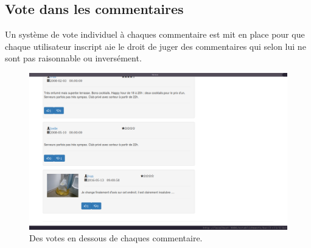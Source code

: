 \documentclass[a4paper,10pt]{article}
\begin{document}
\subsection{Vote dans les commentaires}
    Un système de vote individuel à chaques commentaire est mit en place pour
    que chaque utilisateur inscript aie le droit de juger des commentaires
    qui selon lui ne sont pas raisonnable ou inversément.

    \begin{figure}[hbt]
        \centering
        \includegraphics[scale=0.3]{./images/picture.png}
        \caption{Des votes en dessous de chaques commentaire.}
    \end{figure}
\end{document}
